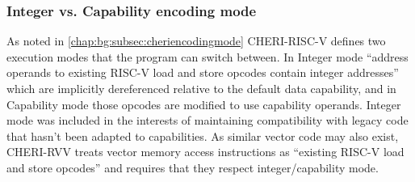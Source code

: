 \subsubsection{Integer vs. Capability encoding mode\label{chap:emu:rvv_int_mode}}
As noted in \cref{chap:bg:subsec:cheriencodingmode} CHERI-RISC-V defines two execution modes that the program can switch between.
In Integer mode \enquote{address operands to existing RISC-V load and store opcodes contain integer addresses} which are implicitly dereferenced relative to the default data capability, and in Capability mode those opcodes are modified to use capability operands.
Integer mode was included in the interests of maintaining compatibility with legacy code that hasn't been adapted to capabilities.
As similar vector code may also exist, CHERI-RVV treats vector memory access instructions as \enquote{existing RISC-V load and store opcodes} and requires that they respect integer/capability mode.